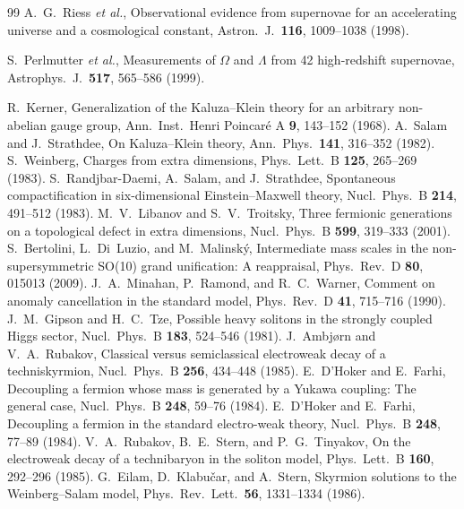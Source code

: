 \documentclass[aps,pra,onecolumn,superscriptaddress,nofootinbib,10pt]{revtex4-2}
\theoremstyle{definition}
\theoremstyle{remark}
\begin{document}
\begin{thebibliography}{99}
 A.~G.~Riess \emph{et al.}, Observational evidence from supernovae for an accelerating universe and a cosmological constant, Astron.\ J.\ \textbf{116}, 1009--1038 (1998).

 S.~Perlmutter \emph{et al.}, Measurements of $\Omega$ and $\Lambda$ from 42 high-redshift supernovae, Astrophys.\ J.\ \textbf{517}, 565--586 (1999).

 R.~Kerner, Generalization of the Kaluza--Klein theory for an arbitrary non-abelian gauge group, Ann.\ Inst.\ Henri Poincar\'e A \textbf{9}, 143--152 (1968).
 A.~Salam and J.~Strathdee, On Kaluza--Klein theory, Ann.\ Phys.\ \textbf{141}, 316--352 (1982).
 S.~Weinberg, Charges from extra dimensions, Phys.\ Lett.\ B \textbf{125}, 265--269 (1983).
 S.~Randjbar-Daemi, A.~Salam, and J.~Strathdee, Spontaneous compactification in six-dimensional Einstein--Maxwell theory, Nucl.\ Phys.\ B \textbf{214}, 491--512 (1983).
 M.~V.~Libanov and S.~V.~Troitsky, Three fermionic generations on a topological defect in extra dimensions, Nucl.\ Phys.\ B \textbf{599}, 319--333 (2001).
 S.~Bertolini, L.~Di~Luzio, and M.~Malinsk\'y, Intermediate mass scales in the non-supersymmetric SO(10) grand unification: A reappraisal, Phys.\ Rev.\ D \textbf{80}, 015013 (2009).
 J.~A.~Minahan, P.~Ramond, and R.~C.~Warner, Comment on anomaly cancellation in the standard model, Phys.\ Rev.\ D \textbf{41}, 715--716 (1990).
 J.~M.~Gipson and H.~C.~Tze, Possible heavy solitons in the strongly coupled Higgs sector, Nucl.\ Phys.\ B \textbf{183}, 524--546 (1981).
 J.~Ambj{\o}rn and V.~A.~Rubakov, Classical versus semiclassical electroweak decay of a techniskyrmion, Nucl.\ Phys.\ B \textbf{256}, 434--448 (1985).
 E.~D'Hoker and E.~Farhi, Decoupling a fermion whose mass is generated by a Yukawa coupling: The general case, Nucl.\ Phys.\ B \textbf{248}, 59--76 (1984).
 E.~D'Hoker and E.~Farhi, Decoupling a fermion in the standard electro-weak theory, Nucl.\ Phys.\ B \textbf{248}, 77--89 (1984).
 V.~A.~Rubakov, B.~E.~Stern, and P.~G.~Tinyakov, On the electroweak decay of a technibaryon in the soliton model, Phys.\ Lett.\ B \textbf{160}, 292--296 (1985).
 G.~Eilam, D.~Klabu\v{c}ar, and A.~Stern, Skyrmion solutions to the Weinberg--Salam model, Phys.\ Rev.\ Lett.\ \textbf{56}, 1331--1334 (1986).

\end{thebibliography}
\end{document}
